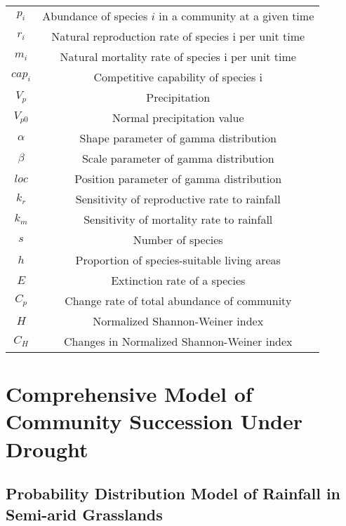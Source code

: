 \documentclass{mcmthesis}
\begin{document}
\begin{table}[h]
	\begin{center}
		\begin{tabular}{cc}
			\hline
			\makebox[0.3\textwidth][c]{Symbol}	&  \makebox[0.7\textwidth][c]{Meaning} 
			\\ \hline
			$p_i$ & Abundance of species $i$ in a community at a given time \\
			$r_i$ & Natural reproduction rate of species i per unit time\\
			$m_i$ & Natural mortality rate of species i per unit time\\
			$cap_i$ & Competitive capability of species i\\
			$V_p$ & Precipitation \\ 
			$V_{p0}$ & Normal precipitation value \\
			$\alpha$ & Shape parameter of gamma distribution \\ 
			$\beta$ &  Scale parameter of gamma distribution \\
			$loc$ &  Position parameter of gamma distribution \\
			$k_r$ & Sensitivity of reproductive rate to rainfall \\
			$k_m$ & Sensitivity of mortality rate to rainfall \\ 
			$s$ & Number of species \\
			$h$ & Proportion of species-suitable living areas \\ 
			$E$ & Extinction rate of a species\\
			$C_p$ & Change rate of total abundance of community\\
			$H$ & Normalized Shannon-Weiner index\\
			$C_H$ & Changes in Normalized Shannon-Weiner index\\
			\hline
		\end{tabular}
	\end{center}
\end{table}

\section{Comprehensive Model of Community Succession Under Drought}
\subsection{Probability Distribution Model of Rainfall in Semi-arid Grasslands}
\end{document}

